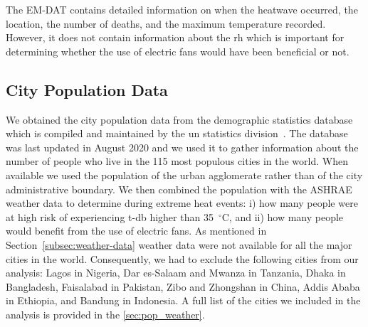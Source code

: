 The EM-DAT contains detailed information on when the heatwave occurred, the location, the number of deaths, and the maximum temperature recorded.
However, it does not contain information about the \ac{rh} which is important for determining whether the use of electric fans would have been beneficial or not.

\subsection{City Population Data}\label{subsec:population-data}

We obtained the city population data from the demographic statistics database which is compiled and maintained by the \ac{un} statistics division~\cite{UNdatare88:online}.
The database was last updated in August 2020 and we used it to gather information about the number of people who live in the 115 most populous cities in the world.
When available we used the population of the urban agglomerate rather than of the city administrative boundary.
We then combined the population with the ASHRAE weather data to determine during extreme heat events: i) how many people were at high risk of experiencing \ac{t-db} higher than 35~$^{\circ}$C\@, and ii) how many people would benefit from the use of electric fans.
As mentioned in Section~\ref{subsec:weather-data} weather data were not available for all the major cities in the world.
Consequently, we had to exclude the following cities from our analysis: Lagos in Nigeria, Dar es-Salaam and Mwanza in Tanzania, Dhaka in Bangladesh, Faisalabad in Pakistan, Zibo and Zhongshan in China, Addis Ababa in Ethiopia, and Bandung in Indonesia.
A full list of the cities we included in the analysis is provided in the \ref{sec:pop_weather}.